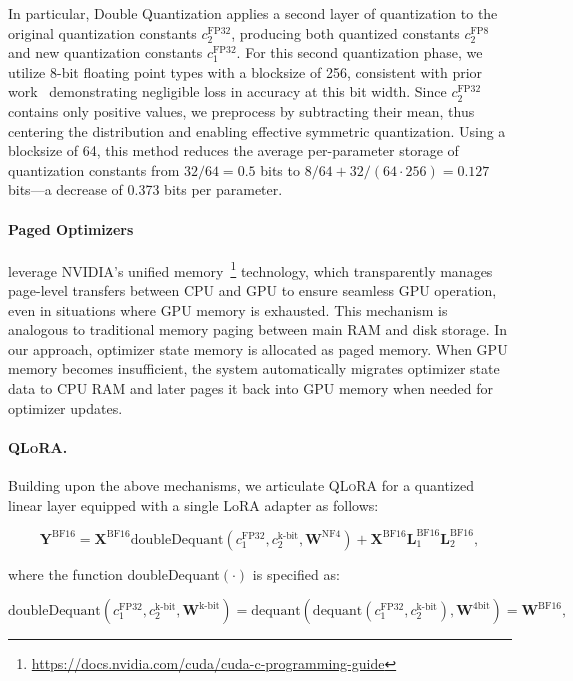 In particular, Double Quantization applies a second layer of quantization to the original quantization constants $c_2^{\text{FP32}}$, producing both quantized constants $c_2^{\text{FP8}}$ and new quantization constants $c_1^{\text{FP32}}$. For this second quantization phase, we utilize 8-bit floating point types with a blocksize of 256, consistent with prior work~\citep{dettmers2022case} demonstrating negligible loss in accuracy at this bit width. Since $c_2^{\text{FP32}}$ contains only positive values, we preprocess by subtracting their mean, thus centering the distribution and enabling effective symmetric quantization. Using a blocksize of 64, this method reduces the average per-parameter storage of quantization constants from $32/64=0.5$ bits to $8/64 + 32/(64\cdot256) = 0.127$ bits—a decrease of 0.373 bits per parameter.

\paragraph{Paged Optimizers} leverage NVIDIA’s unified memory~\footnote{\tiny \url{https://docs.nvidia.com/cuda/cuda-c-programming-guide}} technology, which transparently manages page-level transfers between CPU and GPU to ensure seamless GPU operation, even in situations where GPU memory is exhausted. This mechanism is analogous to traditional memory paging between main RAM and disk storage. In our approach, optimizer state memory is allocated as paged memory. When GPU memory becomes insufficient, the system automatically migrates optimizer state data to CPU RAM and later pages it back into GPU memory when needed for optimizer updates.

\paragraph{\textsc{QLoRA}.} Building upon the above mechanisms, we articulate \textsc{QLoRA} for a quantized linear layer equipped with a single LoRA adapter as follows:

\begin{equation}
    \mathbf{Y}^{\text{BF16}} =  \mathbf{X}^{\text{BF16}} \text{doubleDequant}(c_1^{\text{FP32}}, c_2^{\text{k-bit}}, \mathbf{W}^{\text{NF4}}) + \mathbf{X}^{\text{BF16}}\mathbf{L}^{\text{BF16}}_1\mathbf{L}^{\text{BF16}}_2,
\end{equation}

where the function doubleDequant$(\cdot)$ is specified as:

\begin{equation}
    \text{doubleDequant}(c_1^{\text{FP32}}, c_2^{\text{k-bit}}, \mathbf{W}^{\text{k-bit}}) = \text{dequant}(\text{dequant}(c_1^{\text{FP32}}, c_2^{\text{k-bit}}), \mathbf{W}^{\text{4bit}}) = \mathbf{W}^{\text{BF16}},
\end{equation}

